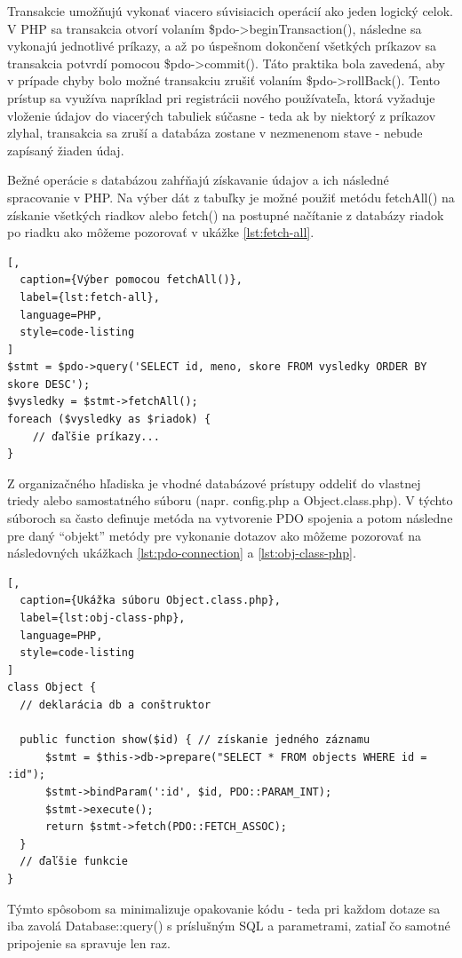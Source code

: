 Transakcie umožňujú vykonať viacero súvisiacich operácií ako jeden logický celok. V PHP sa transakcia otvorí volaním 
\$pdo->beginTransaction(), následne sa vykonajú jednotlivé príkazy, a až po úspešnom dokončení všetkých príkazov 
sa transakcia potvrdí pomocou \$pdo->commit(). Táto praktika bola zavedená, aby v prípade chyby bolo možné transakciu 
zrušiť volaním \$pdo->rollBack(). Tento prístup sa využíva napríklad pri registrácii nového používateľa, ktorá vyžaduje vloženie 
údajov do viacerých tabuliek súčasne - teda ak by niektorý z príkazov zlyhal, transakcia sa zruší a databáza zostane v 
nezmenenom stave - nebude zapísaný žiaden údaj.

Bežné operácie s databázou zahŕňajú získavanie údajov a ich následné spracovanie v PHP. Na výber dát z tabuľky je možné použiť metódu 
fetchAll() na získanie všetkých riadkov alebo fetch() na postupné načítanie z databázy riadok po riadku ako môžeme pozorovať v 
ukážke \ref{lst:fetch-all}.

\begin{lstlisting}[,
  caption={Výber pomocou fetchAll()},
  label={lst:fetch-all},
  language=PHP,
  style=code-listing
]
$stmt = $pdo->query('SELECT id, meno, skore FROM vysledky ORDER BY skore DESC');
$vysledky = $stmt->fetchAll();
foreach ($vysledky as $riadok) {
    // ďaľšie príkazy...
}
\end{lstlisting}

Z organizačného hľadiska je vhodné databázové prístupy oddeliť do vlastnej triedy alebo samostatného súboru 
(napr. config.php a Object.class.php). V týchto súboroch sa často definuje metóda na vytvorenie PDO spojenia 
a potom následne pre daný ``objekt'' metódy pre vykonanie dotazov ako môžeme pozorovať na následovných ukážkach 
\ref{lst:pdo-connection} a \ref{lst:obj-class-php}.

\begin{lstlisting}[,
  caption={Ukážka súboru Object.class.php},
  label={lst:obj-class-php},
  language=PHP,
  style=code-listing
]
class Object {
  // deklarácia db a conštruktor

  public function show($id) { // získanie jedného záznamu
      $stmt = $this->db->prepare("SELECT * FROM objects WHERE id = :id");
      $stmt->bindParam(':id', $id, PDO::PARAM_INT);
      $stmt->execute();
      return $stmt->fetch(PDO::FETCH_ASSOC);
  }
  // ďaľšie funkcie
}
\end{lstlisting}

Týmto spôsobom sa minimalizuje opakovanie kódu - teda pri každom dotaze sa iba zavolá Database::query() s 
príslušným SQL a parametrami, zatiaľ čo samotné pripojenie sa spravuje len raz.

